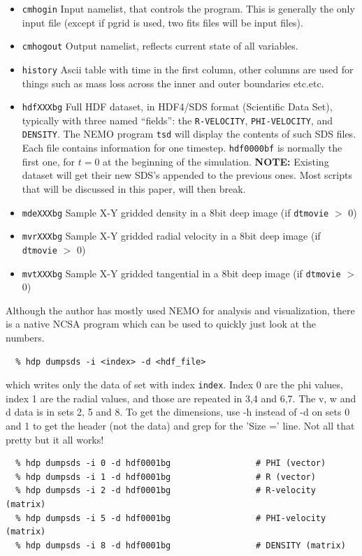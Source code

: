 \documentclass[10pt,dvips]{article}
\begin{document}
\begin{itemize}

\item
{\tt cmhogin}
Input namelist, that controls the program. This is generally
the only input file (except if pgrid is used, two fits files
will be input files).

\item
{\tt cmhogout}
Output namelist, reflects current state of all variables.

\item
{\tt history}
Ascii table with time in the first column, other columns 
are used for things such as mass loss across the inner and 
outer boundaries etc.etc.

\item
{\tt hdfXXXbg}
Full HDF dataset, in HDF4/SDS format (Scientific Data Set), typically
with three named ``fields'': the 
{\tt R-VELOCITY}, {\tt PHI-VELOCITY}, and {\tt DENSITY}.
The NEMO program {\tt tsd} will display the contents of
such SDS files. Each file contains information for one timestep.
{\tt hdf0000bf} is normally the first one, for $t=0$ at the beginning
of the simulation.
\newline
{\bf NOTE:} Existing dataset will get their new SDS's appended to
the previous ones. Most scripts that will be discussed in this
paper, will then break. 

\item
{\tt mdeXXXbg}
Sample X-Y gridded density in a 8bit deep image (if {\tt dtmovie} $>$ 0)

\item
{\tt mvrXXXbg}
Sample X-Y gridded radial velocity in a 8bit deep image (if {\tt dtmovie} $>$ 0)

\item
{\tt mvtXXXbg}
Sample X-Y gridded tangential in a 8bit deep image (if {\tt dtmovie} $>$ 0)

\end{itemize}

Although the author has mostly used NEMO for analysis and visualization, 
there is a native NCSA program which can be used to quickly just look
at the numbers.

\begin{verbatim}
  % hdp dumpsds -i <index> -d <hdf_file>
\end{verbatim}
which writes only the data of set with index 
{\tt index}.  Index 0 are the phi
values, index 1 are the radial values, and those are repeated in 3,4 and
6,7.  The v, w and d data is in sets 2, 5 and 8.  To get the dimensions,
use -h instead of -d on sets 0 and 1 to get the header (not the data) and
grep for the 'Size =' line.  Not all that pretty but it all works!
\begin{verbatim}
  % hdp dumpsds -i 0 -d hdf0001bg                 # PHI (vector)
  % hdp dumpsds -i 1 -d hdf0001bg                 # R (vector)
  % hdp dumpsds -i 2 -d hdf0001bg                 # R-velocity (matrix)
  % hdp dumpsds -i 5 -d hdf0001bg                 # PHI-velocity (matrix)
  % hdp dumpsds -i 8 -d hdf0001bg                 # DENSITY (matrix)
  
\end{verbatim}
\end{document}
